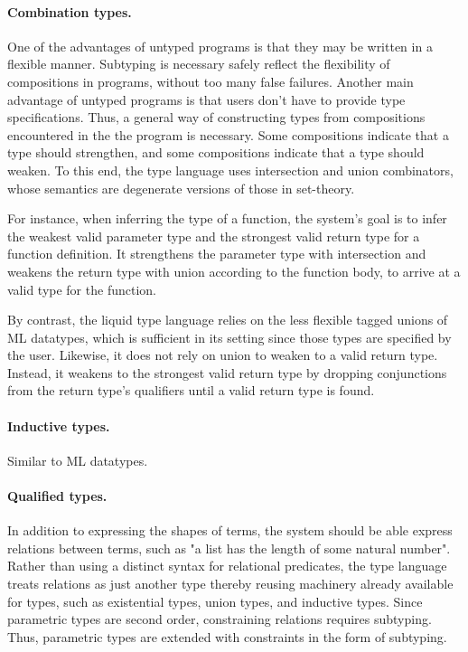 \documentclass[sigplan,screen,review]{acmart}
\begin{document}
\paragraph{Combination types.}
One of the advantages of untyped programs is that they may be written in a flexible manner.
Subtyping is necessary safely reflect the flexibility of compositions in programs, without too many false failures.
Another main advantage of untyped programs is that users don't have to provide type specifications.
Thus, a general way of constructing types from compositions encountered in the the program is necessary.
Some compositions indicate that a type should strengthen, and some compositions indicate that a type should weaken.
To this end, the type language uses intersection and union combinators, 
whose semantics are degenerate versions of those in set-theory.

For instance, when inferring the type of a function, 
the system's goal is to infer the weakest valid parameter type and the strongest valid return type for a function definition.
It strengthens the parameter type with intersection and weakens the return type with union according to the function body,
to arrive at a valid type for the function.  

By contrast, the liquid type language relies on the less flexible tagged unions of ML datatypes, 
which is sufficient in its setting since those types are specified by the user. 
Likewise, it does not rely on union to weaken to a valid return type. 
Instead, it weakens to the strongest valid return type by dropping conjunctions from 
the return type's qualifiers until a valid return type is found.

\paragraph{Inductive types.} Similar to ML datatypes.

\paragraph{Qualified types.}
In addition to expressing the shapes of terms, the system should be able express relations between terms,
such as "a list has the length of some natural number".
Rather than using a distinct syntax for relational predicates, 
the type language treats relations as just another type thereby reusing machinery already 
available for types, such as existential types, union types, and inductive types.
Since parametric types are second order, constraining relations requires subtyping.
Thus, parametric types are extended with constraints in the form of subtyping.
\end{document}
